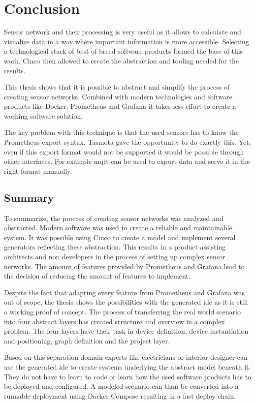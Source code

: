 \chapter{Conclusion}
\label{chapter:conclusion}
Sensor network and their processing is very useful as it allows to calculate and visualize data in a way where important information is more accessible. Selecting a technological stack of best of breed software products formed the base of this work. Cinco then allowed to create the abstraction and tooling needed for the results.

This thesis shows that it is possible to abstract and simplify the process of creating sensor networks. Combined with modern technologies and software products like Docker, Prometheus and Grafana it takes less effort to create a working software solution. 

The key problem with this technique is that the used sensors has to know the Prome\-theus export syntax. Tasmota gave the opportunity to do exactly this. Yet, even if this export format would not be supported it would be possible through other interfaces. For example \gls{mqtt} can be used to export data and serve it in the right format manually. 

\section{Summary}
To summarize, the process of creating sensor networks was analyzed and abstracted. Modern software was used to create a reliable and maintainable system. It was possible using Cinco to create a model and implement several generators reflecting these abstraction. This results in a product assisting architects and non developers in the process of setting up complex sensor networks. The amount of features provided by Prometheus and Grafana lead to the decision of reducing the amount of features to implement. 

Despite the fact that adapting every feature from Prometheus and Grafana was out of scope, the thesis shows the possibilities with the generated \gls{ide} as it is still a working proof of concept. The process of transferring the real world scenario into four abstract layers has created structure and overview in a complex problem. The four layers have their task in device definition, device instantiation and positioning, graph definition and the project layer. 

Based on this separation domain experts like electricians or interior designer can use the generated \gls{ide} to create systems underlying the abstract model beneath it. They do not have to learn to code or learn how the used software products has to be deployed and configured. A modeled scenario can than be converted into a runnable deployment using Docker Compose resulting in a fast deploy chain.

